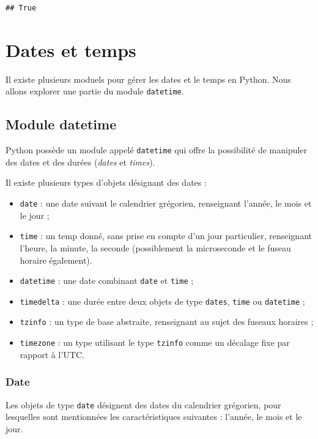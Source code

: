 \documentclass[12pt,]{book}
\providecommand{\tightlist}{%
  \setlength{\itemsep}{0pt}\setlength{\parskip}{0pt}}
\numberwithin{equation}{section}
\numberwithin{countremarque}{section}
\begin{document}
\begin{lstlisting}
## True
\end{lstlisting}

\section{Dates et temps}\label{dates-et-temps}

Il existe plusieurs moduels pour gérer les dates et le temps en Python.
Nous allons explorer une partie du module \texttt{datetime}.

\subsection{Module datetime}\label{module-datetime}

Python possède un module appelé \texttt{datetime} qui offre la
possibilité de manipuler des dates et des durées (\emph{dates} et
\emph{times}).

Il existe plusieurs types d'objets désignant des dates :

\begin{itemize}
\tightlist
\item
  \texttt{date} : une date suivant le calendrier grégorien, renseignant
  l'année, le mois et le jour ;
\item
  \texttt{time} : un temp donné, sans prise en compte d'un jour
  particulier, renseignant l'heure, la minute, la seconde (possiblement
  la microseconde et le fuseau horaire également).
\item
  \texttt{datetime} : une date combinant \texttt{date} et \texttt{time}
  ;
\item
  \texttt{timedelta} : une durée entre deux objets de type
  \texttt{dates}, \texttt{time} ou \texttt{datetime} ;
\item
  \texttt{tzinfo} : un type de base abstraite, renseignant au sujet des
  fuseaux horaires ;
\item
  \texttt{timezone} : un type utilisant le type \texttt{tzinfo} comme un
  décalage fixe par rapport à l'UTC.
\end{itemize}

\subsubsection{Date}\label{type-date}

Les objets de type \texttt{date} désignent des dates du calendrier
grégorien, pour lesquelles sont mentionnées les caractéristiques
suivantes : l'année, le mois et le jour.
\end{document}
